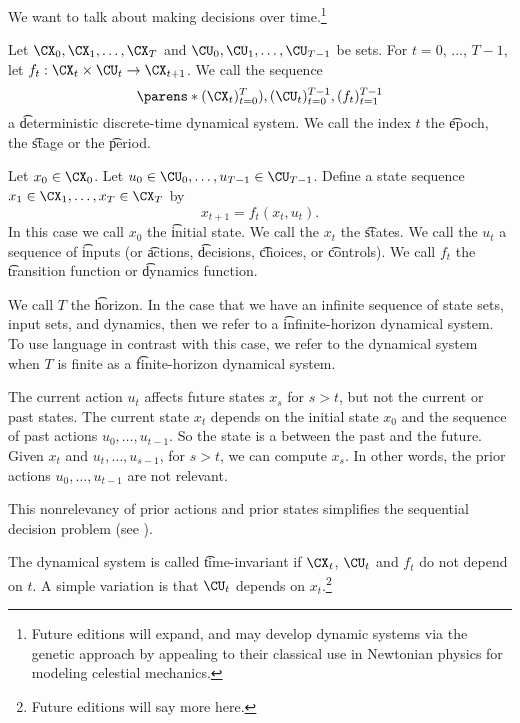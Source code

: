 

We want to talk about making decisions over time.\footnote{Future editions will expand, and may develop dynamic systems via the genetic approach by appealing to their classical use in Newtonian physics for modeling celestial mechanics.}


Let $\CX_0, \CX_1, \dots, \CX_{T}$ and $\CU_0, \CU_1, \dots, \CU_{T-1}$ be sets.
For $t = 0$, $\dots$, $T-1$, let $f_{t}: \CX_t \times \CU_t \to \CX_{t+1}$.
We call the sequence
\[
	\parens*{(\CX_t)_{t = 0}^{T}), (\CU_t)_{t=0}^{T-1}, (f_t)_{t=1}^{T-1}}
\]
a \t{deterministic discrete-time dynamical system}.
We call the index $t$ the \t{epoch}, the \t{stage} or the \t{period}.

Let $x_0 \in \CX_0$.
Let $u_0 \in \CU_0, \dots, u_{T-1} \in \CU_{T-1}$. Define a state sequence $x_1 \in \CX_1, \dots, x_T \in \CX_T$ by
\[
    x_{t+1} = f_t(x_t, u_t).
\]
In this case we call $x_0$ the \t{initial state}.
We call the $x_t$ the \t{states}.
We call the $u_t$ a sequence of \t{inputs} (or \t{actions}, \t{decisions}, \t{choices}, or \t{controls}).
We call $f_t$ the \t{transition function} or \t{dynamics function}.

We call $T$ the \t{horizon}.
In the case that we have an infinite sequence of state sets, input sets, and dynamics, then we refer to a \t{infinite-horizon} dynamical system.
To use language in contrast with this case, we refer to the dynamical system when $T$ is finite as a \t{finite-horizon} dynamical system.


The current action $u_t$ affects future states $x_{s}$ for $s > t$, but not the current or past states.
The current state $x_t$ depends on the initial state $x_0$ and the sequence of past actions $u_0, \dots, u_{t-1}$.
So the state is a  between the past and the future.
Given $x_t$ and $u_t, \dots, u_{s-1}$, for $s > t$, we can compute $x_s$.
In other words, the prior actions $u_0, \dots, u_{t-1}$ are not relevant.

This nonrelevancy of prior actions and prior states simplifies the sequential decision problem (see ).


The dynamical system is called \t{time-invariant} if $\CX_{t}$, $\CU_t$ and $f_t$ do not depend on $t$.
A simple variation is that $\CU_t$ depends on $x_t$.\footnote{Future editions will say more here.}

